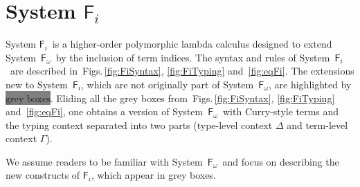 \documentclass{llncs}
\newcommand{\Figs}[1]{Figs.\,\ref{fig:#1}}
\newcommand{\newFi}[1]{\colorbox{grey}{\ensuremath{#1}}}
\newcommand{\Fi}{\ensuremath{\mathsf{F}_i}}
\newcommand{\Fw}{\ensuremath{\mathsf{F}_\omega}}
\begin{document}
\section{System \Fi} \label{sec:Fi}
System \Fi\ is a higher-order polymorphic lambda calculus 
designed to extend System~\Fw\ by the inclusion of term indices.
The syntax and rules of System~\Fi\ are described in~\Figs{FiSyntax},
\ref{fig:FiTyping} and~\ref{fig:eqFi}. 
The extensions new to System~\Fi, which are not originally part of System~\Fw, 
are highlighted by \newFi{\text{grey boxes}}.
Eliding all the grey boxes from~\Figs{FiSyntax}, \ref{fig:FiTyping}
and~\ref{fig:eqFi}, one obtains a version of System~\Fw\ 
with Curry-style terms and the typing context separated into two parts
(type-level context $\Delta$ and term-level context $\Gamma$).

We assume readers to be familiar with System~\Fw\
and focus on describing the new constructs of \Fi, which appear in grey boxes.
\end{document}
